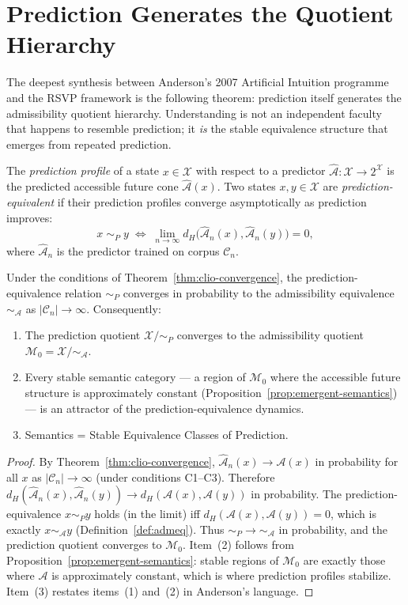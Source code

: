 \documentclass[12pt, a4paper, oneside]{book}
\newcommand{\Adm}{\mathcal{A}}
\newcommand{\X}{\mathcal{X}}
\newcommand{\M}{\mathcal{M}}
\newcommand{\C}{\mathcal{C}}
\newcommand{\dH}{d_H}
\newcommand{\SA}{{\sim_{\!\Adm}}}
\begin{document}
\section{Prediction Generates the Quotient Hierarchy}
\label{sec:prediction-generates}

The deepest synthesis between Anderson's 2007 Artificial Intuition
programme and the RSVP framework is the following theorem: prediction
itself generates the admissibility quotient hierarchy. Understanding is
not an independent faculty that happens to resemble prediction; it
\emph{is} the stable equivalence structure that emerges from repeated
prediction.

\begin{definition}
\label{def:prediction-profile}
The \emph{prediction profile} of a state $x \in \X$ with respect to a
predictor $\hat{\Adm} : \X \to 2^\X$ is the predicted accessible future
cone $\hat{\Adm}(x)$.
Two states $x, y \in \X$ are \emph{prediction-equivalent} if their
prediction profiles converge asymptotically as prediction improves:
\[
  x \;\sim_P\; y
  \;\iff\;
  \lim_{n \to \infty} \dH\bigl(\hat{\Adm}_n(x), \hat{\Adm}_n(y)\bigr)
  = 0,
\]
where $\hat{\Adm}_n$ is the predictor trained on corpus $\C_n$.
\end{definition}

\begin{theorem}
\label{thm:semantic-emergence}
Under the conditions of Theorem~\ref{thm:clio-convergence}, the
prediction-equivalence relation $\sim_P$ converges in probability to
the admissibility equivalence $\SA$ as $|\C_n| \to \infty$.
Consequently:
\begin{enumerate}
  \item The prediction quotient $\X/\!\sim_P$ converges to the
    admissibility quotient $\M_0 = \X/\SA$.
  \item Every stable semantic category --- a region of $\M_0$ where
    the accessible future structure is approximately constant
    (Proposition~\ref{prop:emergent-semantics}) --- is an attractor
    of the prediction-equivalence dynamics.
  \item Semantics = Stable Equivalence Classes of Prediction.
\end{enumerate}
\end{theorem}

\begin{proof}
By Theorem~\ref{thm:clio-convergence}, $\hat{\Adm}_n(x) \to \Adm(x)$
in probability for all $x$ as $|\C_n| \to \infty$ (under conditions
C1--C3). Therefore $\dH(\hat{\Adm}_n(x), \hat{\Adm}_n(y)) \to
\dH(\Adm(x), \Adm(y))$ in probability. The prediction-equivalence
$x \sim_P y$ holds (in the limit) iff $\dH(\Adm(x), \Adm(y)) = 0$,
which is exactly $x \SA y$ (Definition~\ref{def:admeq}). Thus
$\sim_P \to \SA$ in probability, and the prediction quotient converges
to $\M_0$. Item~(2) follows from Proposition~\ref{prop:emergent-semantics}:
stable regions of $\M_0$ are exactly those where $\Adm$ is approximately
constant, which is where prediction profiles stabilize. Item~(3)
restates items~(1) and~(2) in Anderson's language.
\end{proof}
\end{document}

